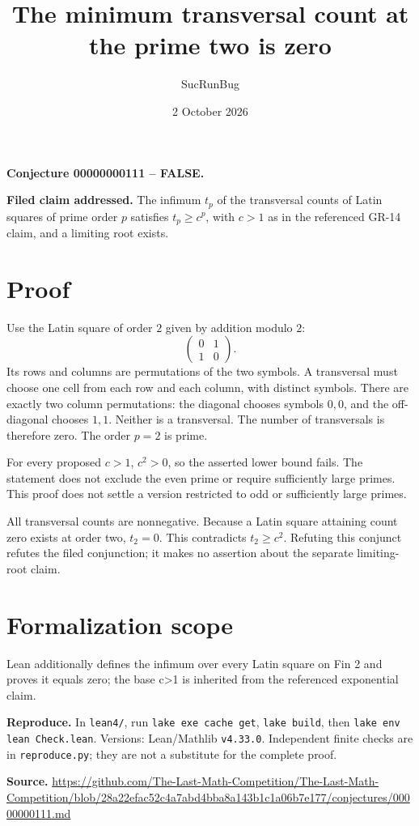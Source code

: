 \documentclass[11pt]{article}
\title{The minimum transversal count at the prime two is zero}
\author{SucRunBug}
\date{2 October 2026}
\begin{document}
\maketitle
\textbf{Conjecture 00000000111 -- FALSE.}

\textbf{Filed claim addressed.} The infimum $t_p$ of the transversal counts of Latin squares of prime order $p$ satisfies $t_p\ge c^p$, with $c>1$ as in the referenced GR-14 claim, and a limiting root exists.

\section*{Proof}
Use the Latin square of order $2$ given by addition modulo $2$:
\[\begin{pmatrix}0&1\\1&0\end{pmatrix}.\]
Its rows and columns are permutations of the two symbols. A transversal must choose one cell from each row and each column, with distinct symbols. There are exactly two column permutations: the diagonal chooses symbols $0,0$, and the off-diagonal chooses $1,1$. Neither is a transversal. The number of transversals is therefore zero. The order $p=2$ is prime.

For every proposed $c>1$, $c^2>0$, so the asserted lower bound fails. The statement does not exclude the even prime or require sufficiently large primes. This proof does not settle a version restricted to odd or sufficiently large primes.

All transversal counts are nonnegative. Because a Latin square attaining count zero exists at order two, $t_2=0$. This contradicts $t_2\ge c^2$. Refuting this conjunct refutes the filed conjunction; it makes no assertion about the separate limiting-root claim.

\section*{Formalization scope}
Lean additionally defines the infimum over every Latin square on Fin 2 and proves it equals zero; the base c>1 is inherited from the referenced exponential claim.

\textbf{Reproduce.} In \texttt{lean4/}, run \texttt{lake exe cache get},
\texttt{lake build}, then \texttt{lake env lean Check.lean}. Versions:
Lean/Mathlib \texttt{v4.33.0}. Independent finite checks are in
\texttt{reproduce.py}; they are not a substitute for the complete proof.

\textbf{Source.} \url{https://github.com/The-Last-Math-Competition/The-Last-Math-Competition/blob/28a22efac52c4a7abd4bba8a143b1c1a06b7e177/conjectures/00000000111.md}
\end{document}
